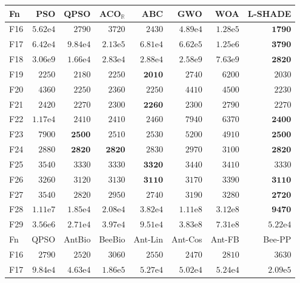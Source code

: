 \begin{tabular}{lrrrrrrr}
\toprule
Fn & PSO & QPSO & ACO$_\mathbb{R}$ & ABC & GWO & WOA & L-SHADE \\
\midrule
F16 & $5.62\mathrm{e}{4}$ & $2790$ & $3720$ & $2430$ & $4.89\mathrm{e}{4}$ & $1.28\mathrm{e}{5}$ & $\mathbf{1790}$ \\
F17 & $6.42\mathrm{e}{4}$ & $9.84\mathrm{e}{4}$ & $2.13\mathrm{e}{5}$ & $6.81\mathrm{e}{4}$ & $6.62\mathrm{e}{5}$ & $1.25\mathrm{e}{6}$ & $\mathbf{3790}$ \\
F18 & $3.06\mathrm{e}{9}$ & $1.66\mathrm{e}{4}$ & $2.83\mathrm{e}{4}$ & $2.88\mathrm{e}{4}$ & $2.58\mathrm{e}{9}$ & $7.63\mathrm{e}{9}$ & $\mathbf{2820}$ \\
F19 & $2250$ & $2180$ & $2250$ & $\mathbf{2010}$ & $2740$ & $6200$ & $2030$ \\
F20 & $4360$ & $2250$ & $2360$ & $2250$ & $4410$ & $4500$ & $2230$ \\
F21 & $2420$ & $2270$ & $2300$ & $\mathbf{2260}$ & $2300$ & $2790$ & $2270$ \\
F22 & $1.17\mathrm{e}{4}$ & $2410$ & $2410$ & $2460$ & $7940$ & $6370$ & $\mathbf{2400}$ \\
F23 & $7900$ & $\mathbf{2500}$ & $2510$ & $2530$ & $5200$ & $4910$ & $\mathbf{2500}$ \\
F24 & $2880$ & $\mathbf{2820}$ & $\mathbf{2820}$ & $2830$ & $2970$ & $3100$ & $\mathbf{2820}$ \\
F25 & $3540$ & $3330$ & $3330$ & $\mathbf{3320}$ & $3440$ & $3410$ & $3330$ \\
F26 & $3260$ & $3120$ & $3130$ & $\mathbf{3110}$ & $3170$ & $3390$ & $\mathbf{3110}$ \\
F27 & $3540$ & $2820$ & $2950$ & $2740$ & $3190$ & $3280$ & $\mathbf{2720}$ \\
F28 & $1.11\mathrm{e}{7}$ & $1.85\mathrm{e}{4}$ & $2.08\mathrm{e}{4}$ & $3.82\mathrm{e}{4}$ & $1.11\mathrm{e}{8}$ & $3.12\mathrm{e}{8}$ & $\mathbf{9470}$ \\
F29 & $3.56\mathrm{e}{6}$ & $2.71\mathrm{e}{4}$ & $3.97\mathrm{e}{4}$ & $9.51\mathrm{e}{4}$ & $3.83\mathrm{e}{8}$ & $7.31\mathrm{e}{8}$ & $5.22\mathrm{e}{4}$ \\
\midrule
Fn & QPSO & AntBio & BeeBio & Ant-Lin & Ant-Cos & Ant-FB & Bee-PP \\
\midrule
F16 & $2790$ & $2520$ & $3060$ & $2550$ & $2470$ & $2810$ & $3630$ \\
F17 & $9.84\mathrm{e}{4}$ & $4.63\mathrm{e}{4}$ & $1.86\mathrm{e}{5}$ & $5.27\mathrm{e}{4}$ & $5.02\mathrm{e}{4}$ & $5.24\mathrm{e}{4}$ & $2.09\mathrm{e}{5}$ \\

\end{tabular}

